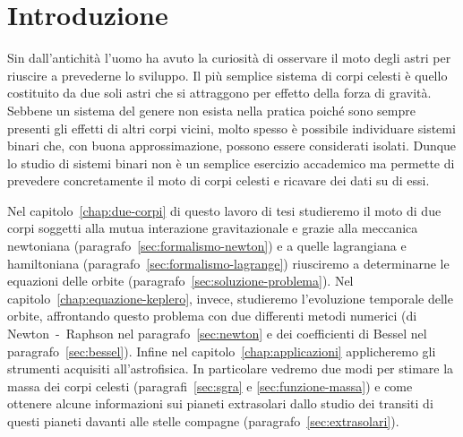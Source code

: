 \chapter{Introduzione}
\label{cha:introduzione}

Sin dall'antichità l'uomo ha avuto la curiosità di osservare il moto degli astri
per riuscire a prevederne lo sviluppo. Il più semplice sistema di corpi celesti
è quello costituito da due soli astri che si attraggono per effetto della forza
di gravità. Sebbene un sistema del genere non esista nella pratica poiché sono
sempre presenti gli effetti di altri corpi vicini, molto spesso è possibile
individuare sistemi binari che, con buona approssimazione, possono essere
considerati isolati. Dunque lo studio di sistemi binari non è un semplice
esercizio accademico ma permette di prevedere concretamente il moto di corpi
celesti e ricavare dei dati su di essi.

Nel capitolo~\ref{chap:due-corpi} di questo lavoro di tesi studieremo il moto di
due corpi soggetti alla mutua interazione gravitazionale e grazie alla meccanica
newtoniana (paragrafo~\ref{sec:formalismo-newton}) e a quelle lagrangiana e
hamiltoniana (paragrafo~\ref{sec:formalismo-lagrange}) riusciremo a determinarne
le equazioni delle orbite (paragrafo~\ref{sec:soluzione-problema}). Nel
capitolo~\ref{chap:equazione-keplero}, invece, studieremo l'evoluzione temporale
delle orbite, affrontando questo problema con due differenti metodi numerici (di
Newton~-~Raphson nel paragrafo~\ref{sec:newton} e dei coefficienti di Bessel nel
paragrafo~\ref{sec:bessel}). Infine nel capitolo~\ref{chap:applicazioni}
applicheremo gli strumenti acquisiti all'astrofisica. In particolare vedremo due
modi per stimare la massa dei corpi celesti (paragrafi~\ref{sec:sgra} e
\ref{sec:funzione-massa}) e come ottenere alcune informazioni sui pianeti
extrasolari dallo studio dei transiti di questi pianeti davanti alle stelle
compagne (paragrafo~\ref{sec:extrasolari}).

